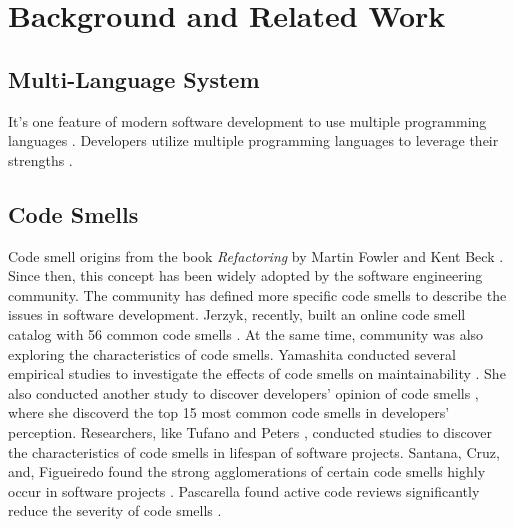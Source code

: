 \section{Background and Related Work}
\label{sec:background}

\subsection{Multi-Language System}
\label{sec:Multi-Language System}

It's one feature of modern software development to use multiple programming languages \cite{723183}.
Developers utilize multiple programming languages to leverage their strengths \cite{7476675}.


\subsection{Code Smells}
\label{sec:Code Smells}
Code smell origins from the book \textit{Refactoring} by Martin Fowler and Kent Beck \cite{Fowler_Beck}.
Since then, this concept has been widely adopted by the software engineering community. The community has
defined more specific code smells \cite{Pysmell,SQLAntipatterns,CleanCode,RefactoringWorkbook} to describe the issues in software development. Jerzyk, recently, built
an online code smell catalog with 56 common code smells \cite{Jerzyk2023}.
At the same time, community was also exploring the characteristics of code smells. Yamashita 
conducted several empirical studies to investigate the effects of code smells on maintainability \cite{6392174} \cite{6405287}. She
also conducted another study to discover developers' opinion of code smells \cite{developersCare}, where 
she discoverd the top 15 most common code smells in developers' perception. Researchers, like Tufano \cite{whenandwhy} and Peters \cite{lifespan}, conducted studies to
discover the characteristics of code smells in lifespan of software projects. Santana, Cruz, and, Figueiredo found the
strong agglomerations of certain code smells highly occur in software projects \cite{Santana}. Pascarella found active code reviews significantly reduce the severity of code smells \cite{Pascarella}.

